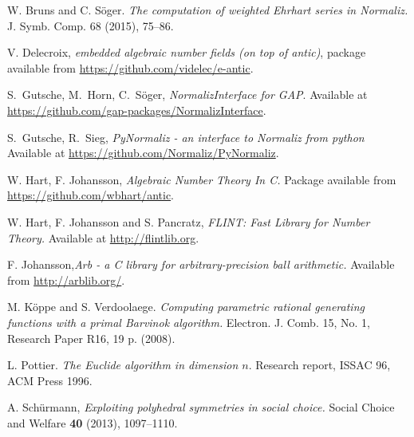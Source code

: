 \documentclass[12pt,a4paper]{scrartcl}
\theoremstyle{definition}
\begin{document}
\begin{thebibliography}{15.}
 W. Bruns and C. S\"oger. {\em The computation of weighted Ehrhart series in Normaliz.} J. Symb. Comp. 68 (2015), 75--86.

 V. Delecroix, {\em embedded algebraic number fields (on top of antic)}, package available from \url{https://github.com/videlec/e-antic}.

 S.~Gutsche, M.~Horn, C.~S\"oger,
\emph{NormalizInterface for GAP}. 
Available at \url{https://github.com/gap-packages/NormalizInterface}.

 S.~Gutsche, R.~Sieg,
\emph{PyNormaliz - an interface to Normaliz from python}
Available at \url{https://github.com/Normaliz/PyNormaliz}.

 W. Hart, F. Johansson, {\em Algebraic Number Theory In C.} Package available from \url{https://github.com/wbhart/antic}.

 W. Hart, F. Johansson and S. Pancratz, \emph{FLINT: Fast Library for Number Theory.} Available at \url{ http://flintlib.org}.

 F. Johansson,{\em Arb - a C library for arbitrary-precision ball arithmetic.} Available from \url{http://arblib.org/}.

 M. K\"oppe and S. Verdoolaege. {\em  Computing
parametric rational generating functions with a primal
Barvinok algorithm.} Electron. J. Comb.
15, No. 1, Research Paper R16, 19 p. (2008).

 L. Pottier. {\em The Euclide algorithm in dimension
$n$}. Research report, ISSAC 96, ACM Press 1996.

 A. Sch\"{u}rmann, {\em Exploiting
	polyhedral symmetries in social choice.}
Social Choice and Welfare \textbf{40} (2013), 1097--1110.
\end{thebibliography}
\end{document}
